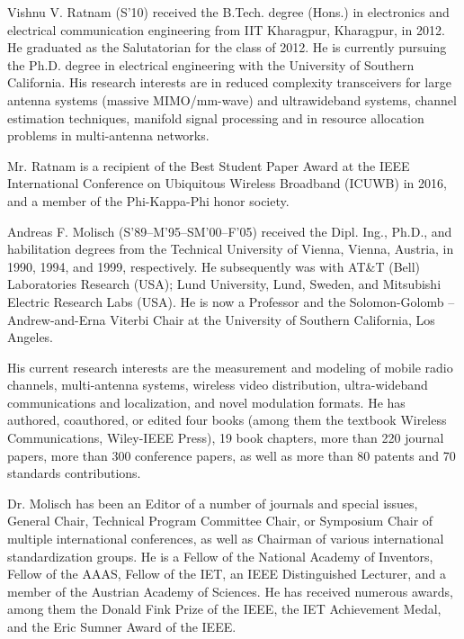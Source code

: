 \documentclass[journal,comsoc]{IEEEtran}
\begin{document}
\begin{IEEEbiography}{Vishnu V. Ratnam}
(S'10) received the B.Tech. degree (Hons.) in electronics and electrical communication engineering from IIT Kharagpur, Kharagpur,
in 2012. He graduated as the Salutatorian for the class of 2012. He is currently pursuing the Ph.D. degree in electrical engineering with the University of Southern California. His research interests are in reduced complexity transceivers for large antenna systems (massive MIMO/mm-wave) and ultrawideband systems, channel estimation techniques, manifold signal processing and in resource allocation problems in multi-antenna networks. 

Mr. Ratnam is a recipient of the Best Student Paper Award at the IEEE International Conference on Ubiquitous Wireless Broadband (ICUWB) in 2016, and a member of the Phi-Kappa-Phi honor society.
\end{IEEEbiography}

\begin{IEEEbiography}{Andreas F. Molisch}
(S'89--M'95--SM'00--F'05) received the Dipl. Ing., Ph.D., and habilitation degrees from the Technical University of Vienna, Vienna, Austria, in 1990, 1994, and 1999, respectively. He subsequently was with AT\&T (Bell) Laboratories Research (USA); Lund University, Lund, Sweden, and Mitsubishi Electric Research Labs (USA). He is now a Professor and the Solomon-Golomb -- Andrew-and-Erna Viterbi Chair at the University of Southern California, Los Angeles. 

His current research interests are the measurement and modeling of mobile radio channels, multi-antenna systems, wireless video distribution, ultra-wideband communications and localization, and novel modulation formats. He has authored, coauthored, or edited four books (among them the textbook Wireless Communications, Wiley-IEEE Press), 19 book chapters, more than 220  journal papers, more than 300 conference papers, as well as more than 80 patents and 70 standards contributions.

Dr. Molisch has been an Editor of a number of journals and special issues, General Chair, Technical Program Committee Chair, or Symposium Chair of multiple international conferences, as well as Chairman of various international standardization groups. He is a Fellow of the National Academy of Inventors, Fellow of the AAAS, Fellow of the IET, an IEEE Distinguished Lecturer, and a member of the Austrian Academy of Sciences. He has received numerous awards, among them the Donald Fink Prize of the IEEE, the IET Achievement Medal, and the Eric Sumner Award of the IEEE.
\end{IEEEbiography}
\end{document}
